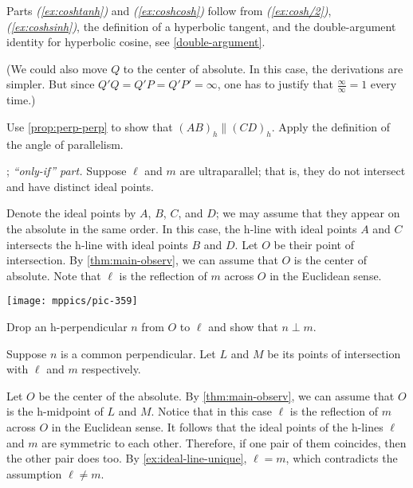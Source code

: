 Parts \textit{(\ref{ex:coshtanh})} and \textit{(\ref{ex:coshcosh})} follow from \textit{(\ref{ex:cosh/2})}, \textit{(\ref{ex:coshsinh})}, the definition of a hyperbolic tangent, and the double-argument identity for hyperbolic cosine, see \ref{double-argument}.

(We could also move $Q$ to the center of absolute.
In this case, the derivations are simpler.
But since $Q'Q=Q'P=Q'P'=\infty$, one has to justify that $\tfrac\infty\infty=1$ every time.)

\setcounter{eqtn}{0}

Use \ref{prop:perp-perp} to show that $(AB)_h\parallel (CD)_h$.
Apply the definition of the angle of parallelism.

\parbf{\ref{ex:ultra-parallel}}; \textit{``only-if'' part.}
Suppose $\ell$ and $m$ are ultraparallel; that is, they do not intersect and have distinct ideal points.

Denote the ideal points by $A$, $B$, $C$, and $D$;
we may assume that they appear on the absolute in the same order.
In this case, the h-line with ideal points $A$ and $C$ intersects the h-line with ideal points $B$ and $D$.
Let $O$ be their point of intersection.
By \ref{thm:main-observ}, we can assume that $O$ is the center of absolute.
Note that $\ell$ is the reflection of $m$ across $O$ in the Euclidean sense.

\begin{Figure}
\vskip-0mm
\centering
\texttt{[image: mppics/pic-359]}
\end{Figure}

Drop an h-perpendicular $n$ from $O$ to $\ell$ and
show that $n\perp m$.

Suppose $n$ is a common perpendicular.
Let $L$ and $M$ be its points of intersection with $\ell$ and $m$ respectively.

Let $O$ be the center of the absolute.
By \ref{thm:main-observ}, we can assume that $O$ is the h-midpoint of $L$ and $M$.
Notice that in this case $\ell$ is the reflection of $m$ across $O$ in the Euclidean sense.
It follows that the ideal points of the h-lines $\ell$ and $m$ are symmetric to each other.
Therefore, if one pair of them coincides, then the other pair does too. 
By \ref{ex:ideal-line-unique}, $\ell=m$, which contradicts the assumption $\ell\ne m$.

